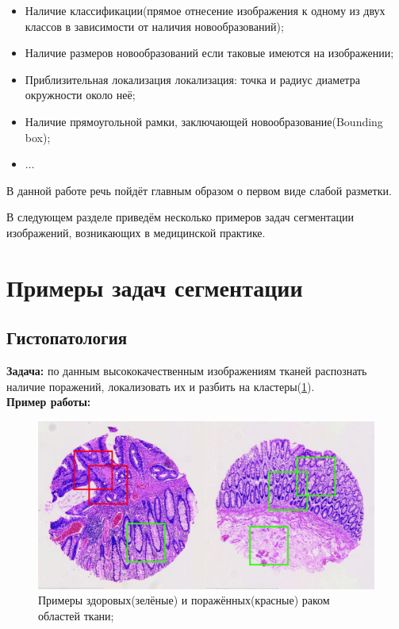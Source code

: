 \begin{itemize}
    \item Наличие классификации(прямое отнесение изображения к одному из двух классов в зависимости от наличия новообразований);
    \item Наличие размеров новообразований если таковые имеются на изображении;
    \item Приблизительная локализация локализация: точка и радиус диаметра окружности около неё;
    \item Наличие прямоугольной рамки, заключающей новообразование(Bounding box);
    \item $\dots$
\end{itemize}

В данной работе речь пойдёт главным образом о первом виде слабой разметки.

В следующем разделе приведём несколько примеров задач сегментации изображений, возникающих в медицинской практике.

\section{Примеры задач сегментации}

\subsection{Гистопатология}

{\bf Задача:} по данным высококачественным изображениям тканей распознать наличие поражений, локализовать их и разбить на кластеры(\ref{fig:histo}).
\\
{\bf Пример работы:} \cite{xu_weakly_2014}


\begin{figure}[ht] 
  \center
  \includegraphics [scale=0.27] {images/histo_1.png}
  \caption{Примеры здоровых(зелёные) и поражённых(красные) раком областей ткани; \cite{xu_weakly_2014}} 
  \label{fig:histo}  
\end{figure}



